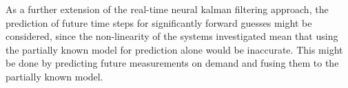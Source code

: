 \documentclass[a4paper,twoside,12pt]{report}
\begin{document}
As a further extension of the real-time neural kalman filtering approach, the prediction of future time steps for significantly forward guesses might be considered, since the non-linearity of the systems investigated mean that using the partially known model for prediction alone would be inaccurate. This might be done by predicting future measurements on demand and fusing them to the partially known model.

%



\end{document}
